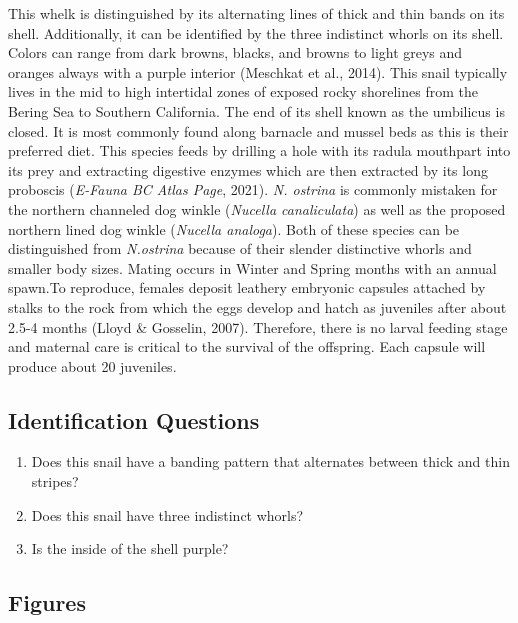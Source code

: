 \documentclass[
]{article}
\begin{document}
This whelk is distinguished by its alternating lines of thick and thin
bands on its shell. Additionally, it can be identified by the three
indistinct whorls on its shell. Colors can range from dark browns,
blacks, and browns to light greys and oranges always with a purple
interior (Meschkat et al., 2014). This snail typically lives in the mid
to high intertidal zones of exposed rocky shorelines from the Bering Sea
to Southern California. The end of its shell known as the umbilicus is
closed. It is most commonly found along barnacle and mussel beds as this
is their preferred diet. This species feeds by drilling a hole with its
radula mouthpart into its prey and extracting digestive enzymes which
are then extracted by its long proboscis (\emph{E-Fauna BC Atlas Page},
2021). \emph{N. ostrina} is commonly mistaken for the northern channeled
dog winkle (\emph{Nucella canaliculata}) as well as the proposed
northern lined dog winkle (\emph{Nucella analoga}). Both of these
species can be distinguished from \emph{N.ostrina} because of their
slender distinctive whorls and smaller body sizes. Mating occurs in
Winter and Spring months with an annual spawn.To reproduce, females
deposit leathery embryonic capsules attached by stalks to the rock from
which the eggs develop and hatch as juveniles after about 2.5-4 months
(Lloyd \& Gosselin, 2007). Therefore, there is no larval feeding stage
and maternal care is critical to the survival of the offspring. Each
capsule will produce about 20 juveniles.

\hypertarget{identification-questions-2}{%
\subsection{Identification Questions}\label{identification-questions-2}}

\begin{enumerate}
\def\labelenumi{\arabic{enumi})}
\item
  Does this snail have a banding pattern that alternates between thick
  and thin stripes?
\item
  Does this snail have three indistinct whorls?
\item
  Is the inside of the shell purple?
\end{enumerate}

\newpage

\hypertarget{figures-3}{%
\subsection{Figures}\label{figures-3}}
\end{document}
